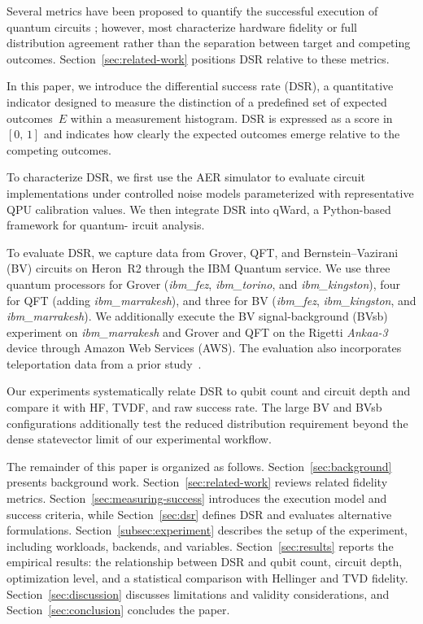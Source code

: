 \documentclass[10pt,conference]{IEEEtran}
\begin{document}
Several metrics have been proposed to quantify the successful execution of quantum circuits \cite{mohapatraBenchmarkingFidelityMetrics_2025}; however, most characterize hardware fidelity or full distribution agreement rather than the separation between target and competing outcomes. Section~\ref{sec:related-work} positions DSR relative to these metrics.

In this paper, we introduce the differential success rate (DSR), a quantitative indicator designed to measure the distinction of a predefined set of expected outcomes~$E$ within a measurement histogram. DSR is expressed as a score in $[0,\,1]$ and indicates how clearly the expected outcomes emerge relative to the competing outcomes.

To characterize DSR, we first use the AER simulator to evaluate circuit implementations under controlled noise models parameterized with representative QPU calibration values. We then integrate DSR into qWard, a Python-based framework for quantum- ircuit analysis.

To evaluate DSR, we capture data from Grover, QFT, and Bernstein--Vazirani (BV) circuits on Heron~R2 through the IBM Quantum service. We use three quantum processors for Grover (\textit{ibm\_fez}, \textit{ibm\_torino}, and \textit{ibm\_kingston}), four for QFT (adding \textit{ibm\_marrakesh}), and three for BV (\textit{ibm\_fez}, \textit{ibm\_kingston}, and \textit{ibm\_marrakesh}). We additionally execute the BV signal-background (BVsb) experiment on \textit{ibm\_marrakesh} and Grover and QFT on the Rigetti \textit{Ankaa-3} device through Amazon Web Services (AWS). The evaluation also incorporates teleportation data from a prior study~\cite{vTPMarquez_2026}.

Our experiments systematically relate DSR to qubit count and circuit depth and compare it with HF, TVDF, and raw success rate. The large BV and BVsb configurations additionally test the reduced distribution requirement beyond the dense statevector limit of our experimental workflow.

The remainder of this paper is organized as follows. Section~\ref{sec:background} presents background work. Section~\ref{sec:related-work} reviews related fidelity metrics. Section~\ref{sec:measuring-success} introduces the execution model and success criteria, while Section~\ref{sec:dsr} defines DSR and evaluates alternative formulations. Section~\ref{subsec:experiment} describes the setup of the experiment, including workloads, backends, and variables. Section~\ref{sec:results} reports the empirical results: the relationship between DSR and qubit count, circuit depth, optimization level, and a statistical comparison with Hellinger and TVD fidelity. Section~\ref{sec:discussion} discusses limitations and validity considerations, and Section~\ref{sec:conclusion} concludes the paper.
\end{document}
